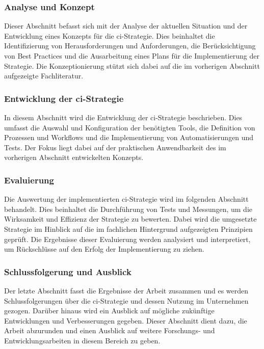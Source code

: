 \subsubsection{Analyse und Konzept}

Dieser Abschnitt befasst sich mit der Analyse der aktuellen Situation und der Entwicklung eines Konzepts für die
\acrshort{ci}-Strategie.
Dies beinhaltet die Identifizierung von Herausforderungen und Anforderungen, die Berücksichtigung von Best Practices
und die Ausarbeitung eines Plans für die Implementierung der Strategie.
Die Konzeptionierung stützt sich dabei auf die im vorherigen Abschnitt aufgezeigte Fachliteratur.

\subsubsection{Entwicklung der \acrshort{ci}-Strategie}

In diesem Abschnitt wird die Entwicklung der \acrshort{ci}-Strategie beschrieben.
Dies umfasst die Auswahl und Konfiguration der benötigten Tools, die Definition von Prozessen und Workflows und die
Implementierung von Automatisierungen und Tests.
Der Fokus liegt dabei auf der praktischen Anwendbarkeit des im vorherigen Abschnitt entwickelten Konzepts.

\subsubsection{Evaluierung}

Die Auswertung der implementierten \acrshort{ci}-Strategie wird im folgenden Abschnitt behandelt.
Dies beinhaltet die Durchführung von Tests und Messungen, um die Wirksamkeit und Effizienz der Strategie zu bewerten.
Dabei wird die umgesetzte Strategie im Hinblick auf die im fachlichen Hintergrund aufgezeigten Prinzipien geprüft.
Die Ergebnisse dieser Evaluierung werden analysiert und interpretiert, um Rückschlüsse auf den Erfolg der
Implementierung zu ziehen.

\subsubsection{Schlussfolgerung und Ausblick}

Der letzte Abschnitt fasst die Ergebnisse der Arbeit zusammen und es werden Schlussfolgerungen über die
\acrshort{ci}-Strategie und dessen Nutzung im Unternehmen gezogen.
Darüber hinaus wird ein Ausblick auf mögliche zukünftige Entwicklungen und Verbesserungen gegeben.
Dieser Abschnitt dient dazu, die Arbeit abzurunden und einen Ausblick auf weitere Forschungs- und Entwicklungsarbeiten
in diesem Bereich zu geben.

\clearpage
